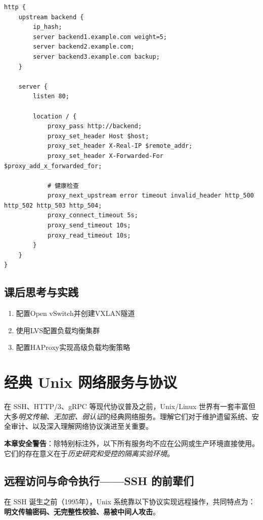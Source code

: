 \documentclass[12pt,UTF8]{ctexbook}
\begin{document}
\begin{lstlisting}
http {
    upstream backend {
        ip_hash;
        server backend1.example.com weight=5;
        server backend2.example.com;
        server backend3.example.com backup;
    }

    server {
        listen 80;
        
        location / {
            proxy_pass http://backend;
            proxy_set_header Host $host;
            proxy_set_header X-Real-IP $remote_addr;
            proxy_set_header X-Forwarded-For $proxy_add_x_forwarded_for;
            
            # 健康检查
            proxy_next_upstream error timeout invalid_header http_500 http_502 http_503 http_504;
            proxy_connect_timeout 5s;
            proxy_send_timeout 10s;
            proxy_read_timeout 10s;
        }
    }
}
\end{lstlisting}

\section{课后思考与实践}
\label{sec:network-advanced-practice}
\begin{enumerate}
    \item 配置Open vSwitch并创建VXLAN隧道
    \item 使用LVS配置负载均衡集群
    \item 配置HAProxy实现高级负载均衡策略
\end{enumerate}

\chapter{经典 Unix 网络服务与协议}
\label{chap:legacy-services}

在 SSH、HTTP/3、gRPC 等现代协议普及之前，Unix/Linux 世界有一套丰富但大多\emph{明文传输、无加密、弱认证}的经典网络服务。理解它们对于维护遗留系统、安全审计、以及深入理解网络协议演进至关重要。

\textbf{本章安全警告}：除特别标注外，以下所有服务均不应在公网或生产环境直接使用。它们的存在意义在于\emph{历史研究和受控的隔离实验环境}。

\section{远程访问与命令执行——SSH 的前辈们}
\label{sec:remote-access-legacy}

在 SSH 诞生之前（1995年），Unix 系统靠以下协议实现远程操作，共同特点为：\textbf{明文传输密码、无完整性校验、易被中间人攻击}。
\end{document}
